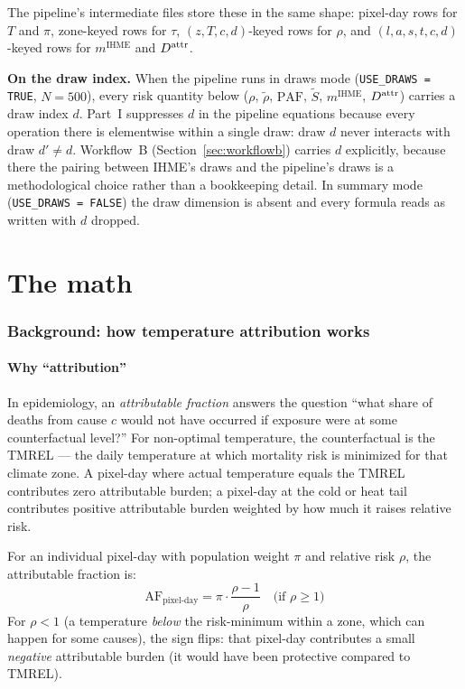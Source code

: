 \documentclass[11pt]{article}
\newcommand{\PAF}{\text{PAF}}
\newcommand{\mIHME}{m^{\text{IHME}}}
\begin{document}
The pipeline's intermediate files store these in the same shape:
pixel-day rows for $T$ and $\pi$, zone-keyed rows for $\tau$,
$(z, T, c, d)$-keyed rows for $\rho$, and $(l, a, s, t, c, d)$-keyed
rows for $\mIHME$ and $\mAttr$.

\textbf{On the draw index.} When the pipeline runs in draws mode
(\texttt{USE\_DRAWS = TRUE}, $N = 500$), every risk quantity below
($\rho$, $\tilde\rho$, $\PAF$, $\tilde S$, $\mIHME$, $\mAttr$) carries a
draw index $d$. Part~I suppresses $d$ in the pipeline equations because
every operation there is elementwise within a single draw: draw $d$ never
interacts with draw $d' \neq d$. Workflow~B (Section~\ref{sec:workflowb})
carries $d$ explicitly, because there the pairing between IHME's draws and
the pipeline's draws is a methodological choice rather than a
bookkeeping detail. In summary mode (\texttt{USE\_DRAWS = FALSE}) the draw
dimension is absent and every formula reads as written with $d$ dropped.

\part{The math}

\section{Background: how temperature attribution works}

\subsection{Why ``attribution''}

In epidemiology, an \emph{attributable fraction} answers the question
``what share of deaths from cause $c$ would not have occurred if exposure
were at some counterfactual level?'' For non-optimal temperature, the
counterfactual is the TMREL --- the daily temperature at which mortality
risk is minimized for that climate zone. A pixel-day where actual
temperature equals the TMREL contributes zero attributable burden; a
pixel-day at the cold or heat tail contributes positive attributable
burden weighted by how much it raises relative risk.

For an individual pixel-day with population weight $\pi$ and relative
risk $\rho$, the attributable fraction is:
\begin{equation}
\text{AF}_{\text{pixel-day}} = \pi \cdot \frac{\rho - 1}{\rho}
\quad \text{(if } \rho \geq 1)
\label{eq:af-pixel}
\end{equation}
For $\rho < 1$ (a temperature \emph{below} the risk-minimum within a zone,
which can happen for some causes), the sign flips: that pixel-day
contributes a small \emph{negative} attributable burden (it would have
been protective compared to TMREL).
\end{document}
